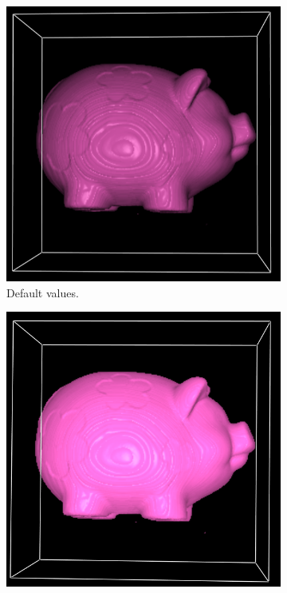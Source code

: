 \documentclass[a4paper]{article}
\begin{document}
\begin{figure}[h]
  \centering
  \begin{subfigure}[b]{0.45\textwidth}
    \centering
    \includegraphics[width=\textwidth]{pig8-phong-default}
    \caption{Default values.}
  \end{subfigure}
  \hfill
  \begin{subfigure}[b]{0.45\textwidth}
    \centering
    \includegraphics[width=\textwidth]{pig8-phong-ambient05}

\end{subfigure}
\end{figure}
\end{document}
